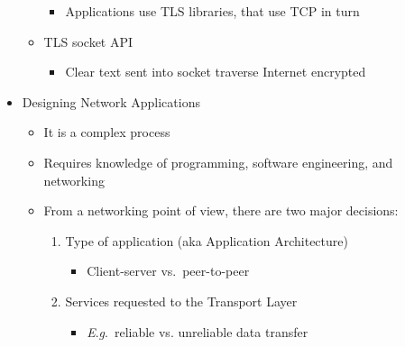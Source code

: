 \begin{itemize}
\begin{itemize}
        \begin{itemize}

          \item Applications use TLS libraries, that use TCP in turn

        \end{itemize}

      \item TLS socket API

        \begin{itemize}

          \item Clear text sent into socket traverse Internet encrypted

        \end{itemize}

    \end{itemize}

  \item Designing Network Applications

    \begin{itemize}

      \item It is a complex process

      \item Requires knowledge of programming, software engineering, and networking

      \item From a networking point of view, there are two major decisions:

        \begin{enumerate}

          \item Type of application (aka Application Architecture)

            \begin{itemize}

              \item Client-server vs.\ peer-to-peer

            \end{itemize}

          \item Services requested to the Transport Layer

            \begin{itemize}

              \item \textit{E}.\textit{g}.\  reliable vs. unreliable data transfer

            \end{itemize}

        \end{enumerate}

    \end{itemize}

\end{itemize}



